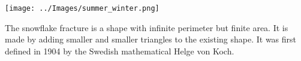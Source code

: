\documentclass[10pt,a4paper]{article}
\begin{document}
\vspace*{\fill}
\begin{center}
\texttt{[image: ../Images/summer\_winter.png]}
\end{center}
\vspace*{\fill}

\begin{center}
\tiny
The snowflake fracture is a shape with infinite perimeter but finite area. It is made by adding smaller and smaller triangles to the existing shape. It was first defined in 1904 by the Swedish mathematical Helge von Koch.
\end{center}
\end{document}
